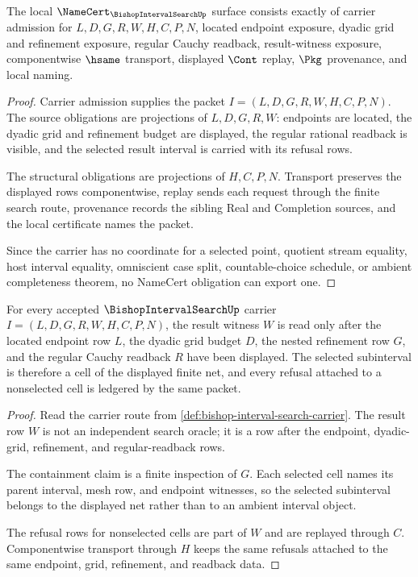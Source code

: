 \begin{theorem}
\label{thm:bishop-interval-search-namecert-obligations}
The local $\NameCert_{\BishopIntervalSearchUp}$ surface consists exactly of carrier admission for $L,D,G,R,W,H,C,P,N$, located endpoint exposure, dyadic grid and refinement exposure, regular Cauchy readback, result-witness exposure, componentwise $\hsame$ transport, displayed $\Cont$ replay, $\Pkg$ provenance, and local naming.
\end{theorem}
\begin{proof}
Carrier admission supplies the packet $I=(L,D,G,R,W,H,C,P,N)$. The source obligations are projections of $L,D,G,R,W$: endpoints are located, the dyadic grid and refinement budget are displayed, the regular rational readback is visible, and the selected result interval is carried with its refusal rows.

The structural obligations are projections of $H,C,P,N$. Transport preserves the displayed rows componentwise, replay sends each request through the finite search route, provenance records the sibling Real and Completion sources, and the local certificate names the packet.

Since the carrier has no coordinate for a selected point, quotient stream equality, host interval equality, omniscient case split, countable-choice schedule, or ambient completeness theorem, no NameCert obligation can export one.
\end{proof}

\begin{theorem}
\label{thm:bishop-interval-search-located-net-correctness}
For every accepted $\BishopIntervalSearchUp$ carrier $I=(L,D,G,R,W,H,C,P,N)$, the result witness $W$ is read only after the located endpoint row $L$, the dyadic grid budget $D$, the nested refinement row $G$, and the regular Cauchy readback $R$ have been displayed. The selected subinterval is therefore a cell of the displayed finite net, and every refusal attached to a nonselected cell is ledgered by the same packet.
\end{theorem}
\begin{proof}
Read the carrier route from \autoref{def:bishop-interval-search-carrier}. The result row $W$ is not an independent search oracle; it is a row after the endpoint, dyadic-grid, refinement, and regular-readback rows.

The containment claim is a finite inspection of $G$. Each selected cell names its parent interval, mesh row, and endpoint witnesses, so the selected subinterval belongs to the displayed net rather than to an ambient interval object.

The refusal rows for nonselected cells are part of $W$ and are replayed through $C$. Componentwise transport through $H$ keeps the same refusals attached to the same endpoint, grid, refinement, and readback data.
\end{proof}

